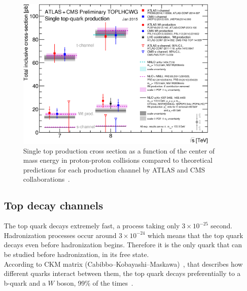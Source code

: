 \begin{figure}[!Hhtbp]
  \begin{center}
    \includegraphics[width=0.9\textwidth]{figs/singletop_allchanvsroots.png}
    \caption{Single top production cross section as a function of the center of mass energy in proton-proton collisions compared to theoretical predictions for each production channel by ATLAS and CMS collaborations~\cite{TOPLHCWG}.}
    \label{fig:SingleProduction}
  \end{center}
\end{figure}


\subsection{Top decay channels}

The top quark decays extremely fast, a process taking only $3\times 10^{-25}$ second. Hadronization processes occur around $3\times 10^{-24}$ which means that the top quark decays even before hadronization begins. Therefore it is the only quark that can be studied before hadronization, in its free state. \\ According to CKM matrix (Cabibbo–Kobayashi–Maskawa)~\cite{PhysRevLett.10.531, Kobayashi01021973}, that describes how different quarks interact between them, the top quark decays preferentially to a b-quark and a $W$ boson, 99\% of the times~\cite{Agashe:2014kda}. 

